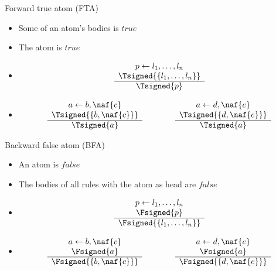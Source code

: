 \begin{frame}{Forward true atom (FTA)}
\begin{itemize}
\item {} Some of an atom's bodies is $\mathit{true}$
\item {} The atom is $\mathit{true}$
\item {}
\[
\begin{array}{c}
p \leftarrow l_1,\dots,l_n \\
\Tsigned{\{l_1,\dots,l_n\}} \\\hline
\Tsigned{p}
\end{array}
\]
\item<2-> 
\[
\begin{array}{c}
a \leftarrow b, \naf{c} \\
\Tsigned{\{b, \naf{c}\}} \\\hline
\Tsigned{a}
\end{array}
\qquad\qquad
\begin{array}{c}
a \leftarrow d, \naf{e} \\
\Tsigned{\{d, \naf{e}\}} \\\hline
\Tsigned{a}
\end{array}
\hfill
\]
\end{itemize}
\end{frame}
\begin{frame}{Backward false atom (BFA)}
\begin{itemize}
\item {} An atom is $\mathit{false}$
\item {} The bodies of all rules with the atom as head are $\mathit{false}$
\item {}
\[
\begin{array}{c}
p \leftarrow l_1,\dots,l_n \\
\Fsigned{p} \\\hline
\Fsigned{\{l_1,\dots,l_n\}}
\end{array}
\]
\item<2-> 
\[
\begin{array}{c}
a \leftarrow b, \naf{c} \\
\Fsigned{a} \\\hline
\Fsigned{\{b, \naf{c}\}}
\end{array}
\qquad\qquad
\begin{array}{c}
a \leftarrow d, \naf{e} \\
\Fsigned{a} \\\hline
\Fsigned{\{d, \naf{e}\}}
\end{array}
\hfill
\]
\end{itemize}
\end{frame}
